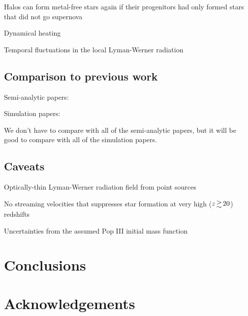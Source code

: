 \documentclass[a4paper,fleqn,usenatbib]{mnras}
\begin{document}
\li Halos can form metal-free stars again if their progenitors had
only formed stars that did not go supernova

\li Dynamical heating \citep{Yoshida03}

\li Temporal fluctuations in the local Lyman-Werner radiation

\subsection{Comparison to previous work}

\li Semi-analytic papers: \citep{Tegmark97, Trenti09, Visbal18,
  Mebane18, Griffen18}

\li Simulation papers: \citep{Machacek01, Yoshida03, Wise07_UVB,
  OShea08, Muratov13}

\li We don't have to compare with all of the semi-analytic papers, but
it will be good to compare with all of the simulation papers.

\subsection{Caveats}

\li Optically-thin Lyman-Werner radiation field from point sources \citep{Schauer17}

\li No streaming velocities that suppresses star formation at very
high ($z \ga 20$) redshifts \citep{Tselia11, Greif11_Delay, Naoz12, OLeary12}

\li Uncertainties from the assumed Pop III initial mass function 

\section{Conclusions}

\section*{Acknowledgements}
\end{document}
